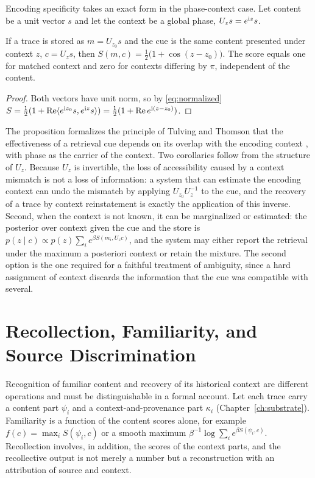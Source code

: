 Encoding specificity takes an exact form in the phase-context case. Let content be a unit vector $s$ and let the context be a global phase, $U_zs=e^{\mathrm{i} z}s$.

\begin{proposition}\label{prop:encspec}
If a trace is stored as $m=U_{z_0}s$ and the cue is the same content presented under context $z$, $c=U_zs$, then $S(m,c)=\tfrac12\bigl(1+\cos(z-z_0)\bigr)$. The score equals one for matched context and zero for contexts differing by $\pi$, independent of the content.
\end{proposition}

\begin{proof}
Both vectors have unit norm, so by \eqref{eq:normalized} $S=\frac12(1+\operatorname{Re}\langle e^{\mathrm{i} z_0}s,e^{\mathrm{i} z}s\rangle)=\frac12(1+\operatorname{Re} e^{\mathrm{i}(z-z_0)})$.
\end{proof}

The proposition formalizes the principle of Tulving and Thomson that the effectiveness of a retrieval cue depends on its overlap with the encoding context \cite{tulving1973}, with phase as the carrier of the context. Two corollaries follow from the structure of $U_z$. Because $U_z$ is invertible, the loss of accessibility caused by a context mismatch is not a loss of information: a system that can estimate the encoding context can undo the mismatch by applying $U_{z_0}U_z^{-1}$ to the cue, and the recovery of a trace by context reinstatement is exactly the application of this inverse. Second, when the context is not known, it can be marginalized or estimated: the posterior over context given the cue and the store is $p(z\mid c)\propto p(z)\sum_ie^{\beta S(m_i,U_zc)}$, and the system may either report the retrieval under the maximum a posteriori context or retain the mixture. The second option is the one required for a faithful treatment of ambiguity, since a hard assignment of context discards the information that the cue was compatible with several.

\chapter{Recollection, Familiarity, and Source Discrimination}\label{ch:source}

Recognition of familiar content and recovery of its historical context are different operations and must be distinguishable in a formal account. Let each trace carry a content part $\psi_i$ and a context-and-provenance part $\kappa_i$ (Chapter~\ref{ch:substrate}). Familiarity is a function of the content scores alone, for example $f(c)=\max_iS(\psi_i,c)$ or a smooth maximum $\beta^{-1}\log\sum_ie^{\beta S(\psi_i,c)}$. Recollection involves, in addition, the scores of the context parts, and the recollective output is not merely a number but a reconstruction with an attribution of source and context.

